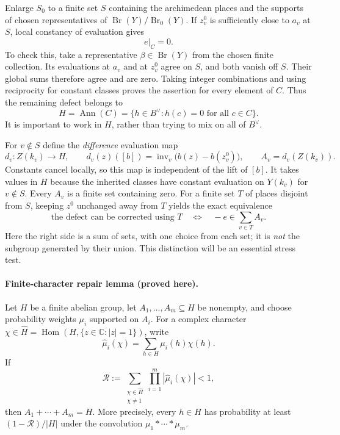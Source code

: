 \documentclass[11pt]{article}
\newcommand{\C}{\mathbb{C}}
\begin{document}
Enlarge $S_0$ to a finite set $S$ containing the archimedean places and the
supports of chosen representatives of
$\operatorname{Br}(Y)/\operatorname{Br}_0(Y)$.  If $z_v^0$ is sufficiently close
to $a_v$ at $S$, local constancy of evaluation gives
\[
 e|_C=0.
\]
To check this, take a representative $\beta\in\operatorname{Br}(Y)$ from the
chosen finite collection.  Its evaluations at $a_v$ and at $z_v^0$ agree on
$S$, and both vanish off $S$.  Their global sums therefore agree and are zero.
Taking integer combinations and using reciprocity for constant classes proves
the assertion for every element of $C$.  Thus the remaining defect belongs to
\[
 H=\operatorname{Ann}(C)=\{h\in B^\vee:h(c)=0\text{ for all }c\in C\}.
\]
It is important to work in $H$, rather than trying to mix on all of $B^\vee$.

For $v\notin S$ define the \emph{difference} evaluation map
\begin{equation}\label{ra151:local-difference}
 d_v:Z(k_v)\longrightarrow H,\qquad
 d_v(z)([b])=\operatorname{inv}_v\bigl(b(z)-b(z_v^0)\bigr),
 \qquad A_v=d_v(Z(k_v)).
\end{equation}
Constants cancel locally, so this map is independent of the lift of $[b]$.
It takes values in $H$ because the inherited classes have constant evaluation
on $Y(k_v)$ for $v\notin S$.  Every $A_v$ is a finite set containing zero.
For a finite set $T$ of places disjoint from $S$, keeping $z^0$ unchanged away
from $T$ yields the exact equivalence
\begin{equation}\label{ra151:sumset}
 \text{the defect can be corrected using $T$}
 \quad\Longleftrightarrow\quad
 -e\in\sum_{v\in T}A_v.
\end{equation}
Here the right side is a sum of sets, with one choice from each set; it is
\emph{not} the subgroup generated by their union.  This distinction will be
an essential stress test.

\paragraph{Finite-character repair lemma (proved here).}
Let $H$ be a finite abelian group, let $A_1,\ldots,A_m\subseteq H$ be nonempty,
and choose probability weights $\mu_i$ supported on $A_i$.  For a complex
character $\chi\in\widehat H=\operatorname{Hom}(H,\{z\in\C:|z|=1\})$, write
\[
 \widehat\mu_i(\chi)=\sum_{h\in H}\mu_i(h)\chi(h).
\]
If
\begin{equation}\label{ra151:fourier-condition}
 \mathcal R:=\sum_{\substack{\chi\in\widehat H\\\chi\ne1}}
                  \prod_{i=1}^m|\widehat\mu_i(\chi)|<1,
\end{equation}
then $A_1+\cdots+A_m=H$.  More precisely, every $h\in H$ has probability at
least $(1-\mathcal R)/|H|$ under the convolution $\mu_1*\cdots*\mu_m$.
\end{document}
